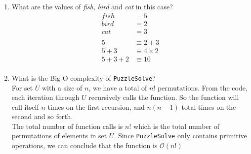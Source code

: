 \begin{enumerate}
    \item What are the values of \emph{fish}, \emph{bird} and \emph{cat} in this case?\
          \begin{align*}
              fish  & =5             \\
              bird  & =2             \\
              cat   & =3             \\~\\
              5     & \equiv2+3      \\
              5+3   & \equiv4\times2 \\
              5+3+2 & \equiv10       \\
          \end{align*}

    \item What is the Big O complexity of \lstinline{PuzzleSolve}?\\
          For set $U$ with a size of $n$, we have a total of $n!$ permutations. From the code, each iteration through $U$ recursively calls the function. So the function will call itself $n$ times on the first recursion, and $n(n-1)$ total times on the second and so forth.\\
          The total number of function calls is $n!$ which is the total number of permutations of elements in set $U$. Since \lstinline{PuzzleSolve} only contains primitive operations, we can conclude that the function is $\mathcal{O}(n!)$
\end{enumerate}
\clearpage